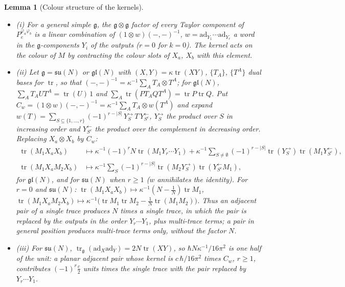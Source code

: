 \documentclass[11pt]{article}
\numberwithin{equation}{section}
\theoremstyle{plain}
\newtheorem{lemma}[theorem]{Lemma}
\theoremstyle{definition}
\begin{document}
\begin{lemma}[Colour structure of the kernels]
\label{lem:tl-colour}
\begin{itemize}
\item (i) For a general simple $\mathfrak g$, the $\mathfrak g\otimes\mathfrak g$ factor of every Taylor component of $P_e^{\varphi_a\varphi_b}$ is a linear combination of $(1\otimes w)(-,-)^{-1}$, $w=\mathrm{ad}_{Y_1}\cdots\mathrm{ad}_{Y_r}$ a word in the $\mathfrak g$-components $Y_i$ of the outputs ($r=0$ for $k=0$). The kernel acts on the colour of $M$ by contracting the colour slots of $X_a$, $X_b$ with this element.
\item (ii) Let $\mathfrak g=\mathfrak{su}(N)$ or $\mathfrak{gl}(N)$ with $(X,Y)=\kappa\operatorname{tr}(XY)$, $\{T_A\}$, $\{T^A\}$ dual bases for $\operatorname{tr}$, so that $(-,-)^{-1}=\kappa^{-1}\sum_AT_A\otimes T^A$; for $\mathfrak{gl}(N)$, $\sum_AT_AUT^A=\operatorname{tr}(U)\,1$ and $\sum_A\operatorname{tr}(PT_AQT^A)=\operatorname{tr}P\operatorname{tr}Q$. Put $C_w=(1\otimes w)(-,-)^{-1}=\kappa^{-1}\sum_AT_A\otimes w(T^A)$ and expand $w(T)=\sum_{S\subseteq\{1,\dots,r\}}(-1)^{r-|S|}\,Y_S^{\to}\,T\,Y_{S^c}^{\leftarrow}$, $Y_S^{\to}$ the product over $S$ in increasing order and $Y_{S^c}^{\leftarrow}$ the product over the complement in decreasing order. Replacing $X_a\otimes X_b$ by $C_w$:
\[
\begin{aligned}
\operatorname{tr}(M_1X_aX_b)&\mapsto\kappa^{-1}(-1)^rN\operatorname{tr}(M_1Y_r\cdots Y_1)+\kappa^{-1}\sum_{S\ne\emptyset}(-1)^{r-|S|}\operatorname{tr}(Y_S^{\to})\operatorname{tr}(M_1Y_{S^c}^{\leftarrow}),\\
\operatorname{tr}(M_1X_aM_2X_b)&\mapsto\kappa^{-1}\sum_S(-1)^{r-|S|}\operatorname{tr}(M_2Y_S^{\to})\operatorname{tr}(Y_{S^c}^{\leftarrow}M_1),
\end{aligned}
\]
for $\mathfrak{gl}(N)$, and for $\mathfrak{su}(N)$ when $r\ge1$ ($w$ annihilates the identity). For $r=0$ and $\mathfrak{su}(N)$: $\operatorname{tr}(M_1X_aX_b)\mapsto\kappa^{-1}(N-\tfrac1N)\operatorname{tr}M_1$, $\operatorname{tr}(M_1X_aM_2X_b)\mapsto\kappa^{-1}\big(\operatorname{tr}M_1\operatorname{tr}M_2-\tfrac1N\operatorname{tr}(M_1M_2)\big)$. Thus an adjacent pair of a single trace produces $N$ times a single trace, in which the pair is replaced by the outputs in the order $Y_r\cdots Y_1$, plus multi-trace terms; a pair in general position produces multi-trace terms only, without the factor $N$.
\item (iii) For $\mathfrak{su}(N)$, $\operatorname{tr}_{\mathfrak g}(\mathrm{ad}_X\mathrm{ad}_Y)=2N\operatorname{tr}(XY)$, so $\hbar N\kappa^{-1}/16\pi^2$ is one half of the unit: a planar adjacent pair whose kernel is $c\,\hbar/16\pi^2$ times $C_w$, $r\ge1$, contributes $(-1)^r\tfrac c2$ units times the single trace with the pair replaced by $Y_r\cdots Y_1$.
\end{itemize}
\end{lemma}
\end{document}
